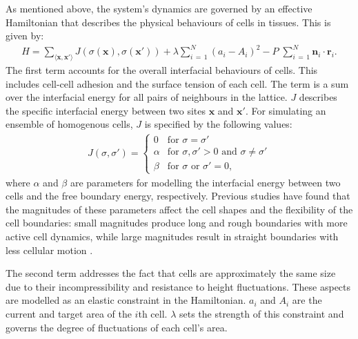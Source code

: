 \documentclass[a4paper,12pt]{article}
\begin{document}
As mentioned above, the system's dynamics are governed by an effective Hamiltonian that describes the physical behaviours of cells in tissues. This is given by:
\begin{eqnarray}
\label{eqn:hamiltonian}
H = \sum_{\langle{\bm{x}, \bm{x'}\rangle}} J\left(\sigma(\bm{x}), \sigma(\bm{x'})\right) + \lambda \sum_{i\,=\,1}^{N} \left(a_i - A_i\right)^2 - P \;\sum_{i\,=\,1}^{N} \bm{n}_i \cdot \bm{r}_i.
\end{eqnarray}
The first term accounts for the overall interfacial behaviours of cells. This includes cell-cell adhesion and the surface tension of each cell. The term is a sum over the interfacial energy for all pairs of neighbours in the lattice. $J$ describes the specific interfacial energy between two sites $\bm{x}$ and $\bm{x}'$. For simulating an ensemble of homogenous cells, $J$ is specified by the following values:
\begin{eqnarray}
\label{eqn:interfacial_energy}
J(\sigma,\sigma') = \left\{
	\begin {array}{ll}
		0 & \textrm{for $\sigma = \sigma'$}\\
		\alpha & \textrm{for $\sigma, \sigma' > 0$ and $\sigma \neq \sigma'$}\\
		\beta & \textrm{for $\sigma$ or $\sigma' = 0$},
	\end{array}
\right.
\end{eqnarray}
where $\alpha$ and $\beta$ are parameters for modelling the interfacial energy between two cells and the free boundary energy, respectively. Previous studies have found that the magnitudes of these parameters affect the cell shapes and the flexibility of the cell boundaries: small magnitudes produce long and rough boundaries with more active cell dynamics, while large magnitudes result in straight boundaries with less cellular motion \cite{szabo2010}.

The second term addresses the fact that cells are approximately the same size due to their incompressibility and resistance to height fluctuations. These aspects are modelled as an elastic constraint in the Hamiltonian. $a_i$ and $A_i$ are the current and target area of the $i$th cell. $\lambda$ sets the strength of this constraint and governs the degree of fluctuations of each cell's area.
\end{document}
